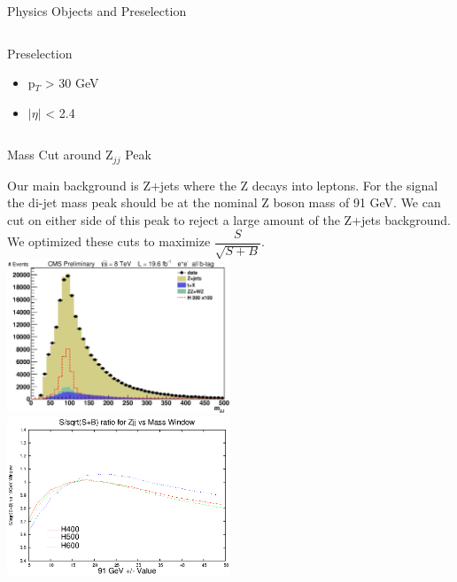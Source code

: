 \begin{frame}{Physics Objects and Preselection}
\begin{columns}
\begin{column}{0.4\textwidth}
        Preselection
        \begin{itemize}
        \item
          p$_{T}$ > 30 GeV
        \item
          $|\eta|$ < 2.4
        \end{itemize}


  \end{column}
      
\end{columns}
\end{frame}


\begin{frame}{Mass Cut around Z$_{jj}$ Peak}
\begin{center}
Our main background is Z+jets where the Z decays into leptons.  For the signal the di-jet mass peak should be at the nominal Z boson mass of 91 GeV.  We can cut on either side of this peak to reject a large amount of the Z+jets background. We optimized these cuts to maximize $\dfrac{S}{\sqrt{S+B}}$.
\\
\includegraphics[width=0.5\textwidth]{images/preselection/el/mJJ.eps}
\includegraphics[width=0.5\textwidth]{images/test_zjj_s_sb_zero.eps}
\end{center}
\end{frame}

